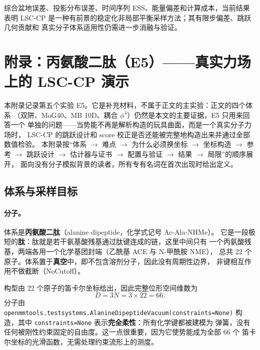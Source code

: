 \documentclass[11pt,a4paper]{article}
\begin{document}
\noindent
综合盆地误差、投影分布误差、时间序列 ESS、能量偏差和计算成本，当前结果表明
LSC-CP 是一种有前景的稳定化非局部平衡采样方法；其有限步偏差、跳跃几何贡献和
真实分子体系适用性仍需进一步消融与验证。

\appendix

\section{附录：丙氨酸二肽（E5）——真实力场上的 LSC-CP 演示}

本附录记录第五个实验 E5。它是补充材料，不属于正文的主实验：正文的四个体系
（双阱、MoG40、MB 10D、耦合 $\phi^4$）仍然是本文的主要证据，E5 只用来回答一个
单独的问题——当势能不再是解析构造的玩具曲面，而是一个真实分子力场时，
LSC-CP 的跳跃设计和 score 校正是否还能被完整地构造出来并通过全部数值检验。
本附录按“体系 $\to$ 难点 $\to$ 为什么必须换坐标 $\to$ 坐标构造 $\to$ 参考 $\to$
跳跃设计 $\to$ 估计器与证书 $\to$ 配置与验证 $\to$ 结果 $\to$ 局限”的顺序展开，
面向没有分子模拟背景的读者，所有专有名词在首次出现时给出定义。

\subsection{体系与采样目标}

\paragraph{分子。}
体系是\textbf{丙氨酸二肽}（alanine dipeptide，化学式记号 Ac-Ala-NHMe）。
它是一段极短的\textbf{肽}：肽就是若干氨基酸残基通过肽键连成的链，这里中间只有
一个丙氨酸残基，两端各用一个化学基团封端（乙酰基 ACE 与 N-甲酰胺 NME），
总共 22 个原子。体系置于\textbf{真空}中，即不包含溶剂分子，因此没有周期性边界，
非键相互作用不做截断（NoCutoff）。

构型由 22 个原子的笛卡尔坐标给出，因此完整位形空间维数为
\begin{equation}
 D=3N=3\times22=66 .
\end{equation}
分子由 \texttt{openmmtools.testsystems.AlanineDipeptideVacuum(constraints=None)}
构造，其中 \texttt{constraints=None} 表示\textbf{完全柔性}：所有化学键都被建模为
弹簧，没有任何被刚性约束固定的自由度。这一点很重要，因为它使势能成为全部 66 个
笛卡尔坐标的光滑函数，无需处理约束流形上的测度。
\end{document}
